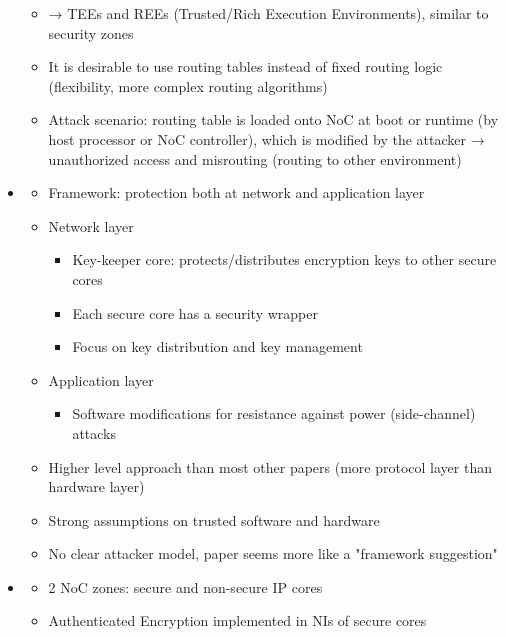 \begin{itemize}
\begin{itemize}
            \item → TEEs and REEs (Trusted/Rich Execution Environments), similar to security zones
            \item It is desirable to use routing tables instead of fixed routing logic (flexibility, more complex routing algorithms)
            \item Attack scenario: routing table is loaded onto NoC at boot or runtime (by host processor or NoC controller), which is modified by
                the attacker → unauthorized access and misrouting (routing to other environment)
        \end{itemize}
    \item \textbf{} \checkmark
        \begin{itemize}
            \item Framework: protection both at network and application layer
            \item Network layer
                \begin{itemize}
                    \item Key-keeper core: protects/distributes encryption keys to other secure cores
                    \item Each secure core has a security wrapper
                    \item Focus on key distribution and key management
                \end{itemize}
            \item Application layer
                \begin{itemize}
                    \item Software modifications for resistance against power (side-channel) attacks
                \end{itemize}
            \item Higher level approach than most other papers (more protocol layer than hardware layer)
            \item Strong assumptions on trusted software and hardware
            \item No clear attacker model, paper seems more like a "framework suggestion"
        \end{itemize}
    \item \textbf{} \checkmark
        \begin{itemize}
            \item 2 NoC zones: secure and non-secure IP cores
            \item Authenticated Encryption implemented in NIs of secure cores

\end{itemize}
\end{itemize}
